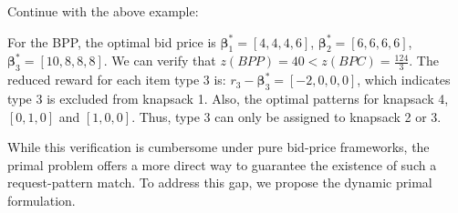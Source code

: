 \begin{example}
Continue with the above example:

For the BPP, the optimal bid price is $\bm{\beta}_{1}^{*} = [4, 4, 4, 6]$, $\bm{\beta}_{2}^{*} = [6, 6, 6, 6]$, $\bm{\beta}_{3}^{*} = [10, 8, 8, 8]$. We can verify that  $z(BPP) = 40 < z(BPC) = \frac{124}{3}$. The reduced reward for each item type 3 is: $r_{3} - \bm{\beta}_{3}^{*} = [-2, 0, 0, 0]$, which indicates type 3 is excluded from knapsack 1. Also, the optimal patterns for knapsack 4, $[0, 1, 0]$ and $[1, 0, 0]$. Thus, type 3 can only be assigned to knapsack 2 or 3.




\end{example}

While this verification is cumbersome under pure bid-price frameworks, the primal problem offers a more direct way to guarantee the existence of such a request-pattern match. To address this gap, we propose the dynamic primal formulation.